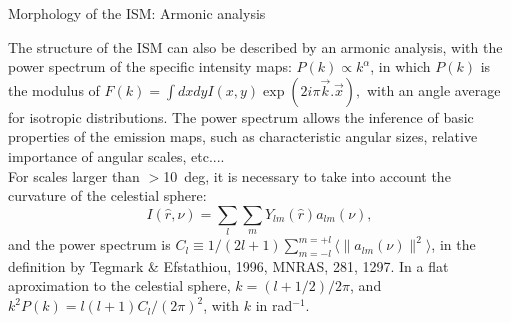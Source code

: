 \begin{frame}{Morphology of the ISM: Armonic analysis} 

The structure of the ISM can also be described by an armonic analysis,
with the power spectrum of the specific intensity maps: \( P(k)
\propto k^{\alpha} \), in which  $P(k)$ is the modulus of  \( F(k) = \int
dxdy I(x,y) \exp(2i\pi
\vec{k}.\vec{x}), \) with an angle average for isotropic
distributions. The power spectrum allows the inference of basic
properties of the emission maps, such as characteristic angular sizes,
relative importance of angular scales, etc....  \\

For scales larger than $>$10~deg, it is necessary to take into account
the curvature of the celestial sphere:
\[I(\hat{r},\nu) = \sum_l\sum_m Y_{lm}(\hat{r}) a_{lm}(\nu),
\] and the power spectrum is 
\(
C_l \equiv 1/(2l+1) \sum_{m=-l}^{m=+l} \langle
\|a_{lm}(\nu)\|^2 \rangle 
\), in the definition by  Tegmark \& Efstathiou, 1996, MNRAS, 281,
1297.  In a flat aproximation to the celestial sphere, $k =
(l+1/2)/2\pi$, and $k^2P(k) = l (l+1) C_l / (2\pi)^2$, with $k$ in
rad$^{-1}$.

\end{frame}

